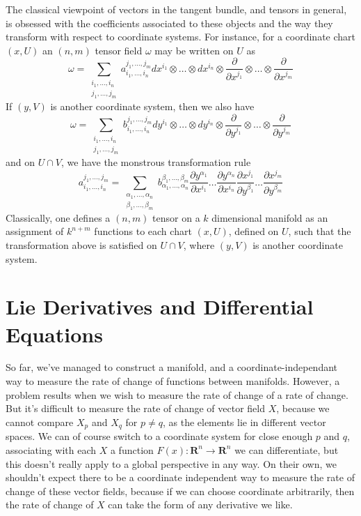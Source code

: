 The classical viewpoint of vectors in the tangent bundle, and tensors in general, is obsessed with the coefficients associated to these objects and the way they transform with respect to coordinate systems. For instance, for a coordinate chart $(x,U)$ an $(n,m)$ tensor field $\omega$ may be written on $U$ as
%
\[ \omega = \sum_{\substack{i_1, \dots, i_n\\j_1, \dots, j_m}} a_{i_1, \dots, i_n}^{j_1, \dots, j_m} dx^{i_1} \otimes \dots \otimes dx^{i_n} \otimes \frac{\partial}{\partial x^{j_1}} \otimes \dots \otimes \frac{\partial}{\partial x^{j_m}} \]
%
If $(y,V)$ is another coordinate system, then we also have
%
\[ \omega = \sum_{\substack{i_1, \dots, i_n\\j_1, \dots, j_m}} b_{i_1, \dots, i_n}^{j_1, \dots, j_m} dy^{i_1} \otimes \dots \otimes dy^{i_n} \otimes \frac{\partial}{\partial y^{j_1}} \otimes \dots \otimes \frac{\partial}{\partial y^{j_m}} \]
%
and on $U \cap V$, we have the monstrous transformation rule
%
\[ a_{i_1, \dots, i_n}^{j_1, \dots, j_m} = \sum_{\substack{\alpha_1, \dots, \alpha_n\\\beta_1, \dots, \beta_m}} b_{\alpha_1, \dots, \alpha_n}^{\beta_1, \dots, \beta_m} \frac{\partial y^{\alpha_1}}{\partial x^{i_1}} \dots \frac{\partial y^{\alpha_n}}{\partial x^{i_n}} \frac{\partial x^{j_1}}{\partial y^{\beta_1}} \dots \frac{\partial x^{j_m}}{\partial y^{\beta_m}} \]
%
Classically, one defines a $(n,m)$ tensor on a $k$ dimensional manifold as an assignment of $k^{n + m}$ functions to each chart $(x,U)$, defined on $U$, such that the transformation above is satisfied on $U \cap V$, where $(y,V)$ is another coordinate system.











\chapter{Lie Derivatives and Differential Equations}

So far, we've managed to construct a manifold, and a coordinate-independant way to measure the rate of change of functions between manifolds. However, a problem results when we wish to measure the rate of change of a rate of change. But it's difficult to measure the rate of change of vector field $X$, because we cannot compare $X_p$ and $X_q$ for $p \neq q$, as the elements lie in different vector spaces. We can of course switch to a coordinate system for close enough $p$ and $q$, associating with each $X$ a function $F(x) : \mathbf{R}^n \to \mathbf{R}^n$ we can differentiate, but this doesn't really apply to a global perspective in any way. On their own, we shouldn't expect there to be a coordinate independent way to measure the rate of change of these vector fields, because if we can choose coordinate arbitrarily, then the rate of change of $X$ can take the form of any derivative we like.


